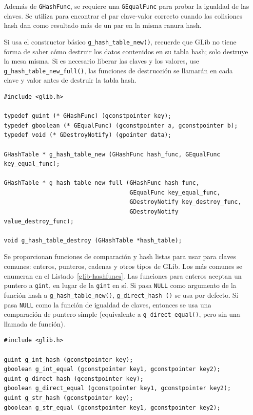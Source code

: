 Además de \lstinline{GHashFunc}, se requiere una \lstinline{GEqualFunc} para probar la igualdad de las claves. Se utiliza para encontrar el par clave-valor correcto cuando las colisiones hash dan como resultado más de un par en la misma ranura hash.

Si usa el constructor básico \lstinline{g_hash_table_new()}, recuerde que GLib no tiene forma de saber cómo destruir los datos contenidos en su tabla hash; solo destruye la mesa misma. Si es necesario liberar las claves y los valores, use \lstinline{g_hash_table_new_full()}, las funciones de destrucción se llamarán en cada clave y valor antes de destruir la tabla hash.

\begin{lstlisting}[float, caption={\lstinline{GHashTable} constructors and destructor}, label=glib-hashnew]
#include <glib.h>

typedef guint (* GHashFunc) (gconstpointer key);
typedef gboolean (* GEqualFunc) (gconstpointer a, gconstpointer b);
typedef void (* GDestroyNotify) (gpointer data);

GHashTable * g_hash_table_new (GHashFunc hash_func, GEqualFunc key_equal_func);

GHashTable * g_hash_table_new_full (GHashFunc hash_func,
                                    GEqualFunc key_equal_func,
                                    GDestroyNotify key_destroy_func,
                                    GDestroyNotify value_destroy_func);

void g_hash_table_destroy (GHashTable *hash_table);
\end{lstlisting}

Se proporcionan funciones de comparación y hash listas para usar para claves comunes: enteros, punteros, cadenas y otros tipos de GLib. Los más comunes se enumeran en el Listado~\ref{glib-hashfuncs}. Las funciones para enteros aceptan un puntero a \lstinline{gint}, en lugar de la \lstinline{gint} en sí. Si pasa \lstinline{NULL} como argumento de la función hash a \lstinline{g_hash_table_new()}, \lstinline{g_direct_hash ()} se usa por defecto. Si pasa \lstinline{NULL} como la función de igualdad de claves, entonces se usa una comparación de puntero simple (equivalente a \lstinline{g_direct_equal()}, pero sin una llamada de función).

\begin{lstlisting}[float, caption={Pre-written hashes/comparisons}, label=glib-hashfuncs]
#include <glib.h>

guint g_int_hash (gconstpointer key);
gboolean g_int_equal (gconstpointer key1, gconstpointer key2);
guint g_direct_hash (gconstpointer key);
gboolean g_direct_equal (gconstpointer key1, gconstpointer key2);
guint g_str_hash (gconstpointer key);
gboolean g_str_equal (gconstpointer key1, gconstpointer key2);
\end{lstlisting}

